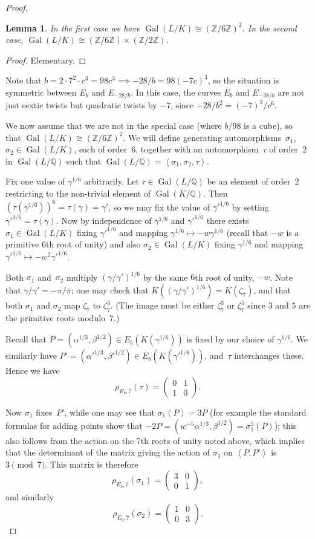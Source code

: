 \documentclass[12pt, reqno]{amsart}
\newcommand{\Q}{\mathbb{Q}}
\newcommand{\Z}{\mathbb{Z}}
\DeclareMathOperator{\Gal}{Gal}
\def\pibar{\overline{\pi}}
\numberwithin{equation}{section}
\newtheorem{lemma}[theorem]{Lemma}
\theoremstyle{definition}
\theoremstyle{remark}
\begin{document}
\begin{proof}
\begin{lemma}
In the first case we have $\Gal(L/K)\cong(\Z/6\Z)^2$.  In the second
case, $\Gal(L/K)\cong(\Z/6\Z)\times(\Z/2\Z)$.
\end{lemma}
\begin{proof}
Elementary.
\end{proof}
Note that $b=2\cdot7^2\cdot c^3 = 98c^3\implies -28/b=98(-7c)^3$, so the situation is
symmetric between $E_b$ and $E_{-28/b}$.  In this case, the curves
$E_b$ and $E_{-28/b}$ are not just sextic twists but quadratic twists
by $-7$, since $-28/b^2=(-7)^3/c^6$.

We now assume that we are not in the special case (where $b/98$ is a
cube), so that $\Gal(L/K)\cong(\Z/6\Z)^2$.  We will define generating
automorphisms~$\sigma_1$, $\sigma_2\in\Gal(L/K)$, each of order~$6$,
together with an automorphism~$\tau$ of order~$2$ in $\Gal(L/\Q)$ such
that $\Gal(L/\Q)=\left<\sigma_1,\sigma_2,\tau\right>$.

Fix one value of $\gamma^{1/6}$ arbitrarily.  Let $\tau\in\Gal(L/\Q)$
be an element of order~$2$ restricting to the non-trivial element of
$\Gal(K/\Q)$.  Then $(\tau(\gamma^{1/6}))^6=\tau(\gamma)=\gamma'$, so
we may fix the value of $\gamma'^{1/6}$ by setting
$\gamma'^{1/6}=\tau(\gamma)$.  Now by independence of $\gamma^{1/6}$
and $\gamma'^{1/6}$ there exists $\sigma_1\in\Gal(L/K)$ fixing
$\gamma'^{1/6}$ and mapping $\gamma^{1/6}\mapsto-w\gamma^{1/6}$ (recall
that $-w$ is a primitive $6$th root of unity) and also
$\sigma_2\in\Gal(L/K)$ fixing $\gamma^{1/6}$ and mapping
$\gamma'^{1/6}\mapsto-w^2\gamma'^{1/6}$.

Both $\sigma_1$ and~$\sigma_2$ multiply $(\gamma/\gamma')^{1/6}$ by
the same $6$th root of unity, $-w$.  Note that
$\gamma/\gamma'=-\pi/\pibar$; one may check that
$K((\gamma/\gamma')^{1/6})=K(\zeta_7)$, and that both $\sigma_1$ and
$\sigma_2$ map $\zeta_7$ to $\zeta_7^3$.  (The image must be either
$\zeta_7^3$ or $\zeta_7^5$ since $3$ and $5$ are the primitive roots
modulo~$7$.)

Recall that $P=(\alpha^{1/3},\beta^{1/2})\in E_b(K(\gamma^{1/6}))$ is
fixed by our choice of $\gamma^{1/6}$.  We similarly have
$P'=(\alpha'^{1/3},\beta'^{1/2})\in E_b(K(\gamma'^{1/6}))$, and~$\tau$
interchanges these.  Hence we have
\[
   \rho_{E_b,7}(\tau) = \begin{pmatrix}0&1\\1&0   \end{pmatrix}.
\]


Now $\sigma_1$ fixes~$P'$, while one may see that $\sigma_1(P)=3P$
(for example the standard formulas for adding points show that
$-2P=(w^{-5}\alpha^{1/3},\beta^{1/2})=\sigma_1^5(P)$); this also
follows from the action on the $7$th roots of unity noted above, which
implies that the determinant of the matrix giving the action of
$\sigma_1$ on $\left<P,P'\right>$ is $3\pmod7$.  This matrix is
therefore
\[
   \rho_{E_b,7}(\sigma_1) = \begin{pmatrix}3&0\\0&1   \end{pmatrix},
\]
and similarly
\[
   \rho_{E_b,7}(\sigma_2) = \begin{pmatrix}1&0\\0&3   \end{pmatrix}.
\]


\end{proof}
\end{document}
